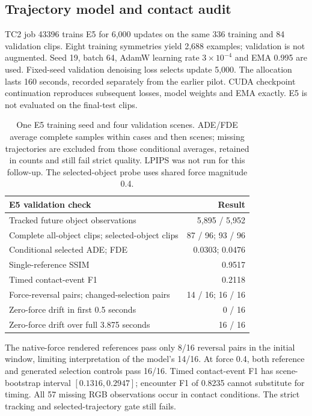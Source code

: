 \documentclass[11pt,a4paper]{article}
\begin{document}
\subsection{Trajectory model and contact audit}
TC2 job 43396 trains E5 for 6,000 updates on the same 336 training and 84 validation clips. Eight training symmetries yield 2,688 examples; validation is not augmented. Seed 19, batch 64, AdamW learning rate $3\times10^{-4}$ and EMA 0.995 are used. Fixed-seed validation denoising loss selects update 5,000. The allocation lasts 160 seconds, recorded separately from the earlier pilot. CUDA checkpoint continuation reproduces subsequent losses, model weights and EMA exactly. E5 is not evaluated on the final-test clips.

\begin{table}[!ht]
\centering
\begin{tabular}{lr}
\hline
E5 validation check & Result \\
\hline
Tracked future object observations & 5,895 / 5,952 \\
Complete all-object clips; selected-object clips & 87 / 96; 93 / 96 \\
Conditional selected ADE; FDE & 0.0303; 0.0476 \\
Single-reference SSIM & 0.9517 \\
Timed contact-event F1 & 0.2118 \\
Force-reversal pairs; changed-selection pairs & 14 / 16; 16 / 16 \\
Zero-force drift in first 0.5 seconds & 0 / 16 \\
Zero-force drift over full 3.875 seconds & 16 / 16 \\
\hline
\end{tabular}
\caption{One E5 training seed and four validation scenes. ADE/FDE average complete samples within cases and then scenes; missing trajectories are excluded from those conditional averages, retained in counts and still fail strict quality. LPIPS was not run for this follow-up. The selected-object probe uses shared force magnitude 0.4.}
\label{tab:trajectory}
\end{table}

The native-force rendered references pass only 8/16 reversal pairs in the initial window, limiting interpretation of the model's 14/16. At force 0.4, both reference and generated selection controls pass 16/16. Timed contact-event F1 has scene-bootstrap interval $[0.1316,0.2947]$; encounter F1 of 0.8235 cannot substitute for timing. All 57 missing RGB observations occur in contact conditions. The strict tracking and selected-trajectory gate still fails.
\end{document}

